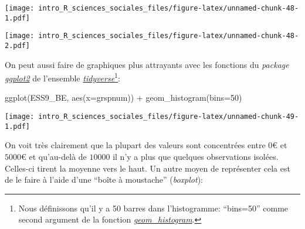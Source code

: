 \documentclass[
]{book}
\newenvironment{Shaded}{\begin{snugshade}}{\end{snugshade}}
\newcommand{\AttributeTok}[1]{\textcolor[rgb]{0.77,0.63,0.00}{#1}}
\newcommand{\DecValTok}[1]{\textcolor[rgb]{0.00,0.00,0.81}{#1}}
\newcommand{\FunctionTok}[1]{\textcolor[rgb]{0.00,0.00,0.00}{#1}}
\newcommand{\NormalTok}[1]{#1}
\newcommand{\SpecialCharTok}[1]{\textcolor[rgb]{0.00,0.00,0.00}{#1}}
\begin{document}
\begin{Shaded}
\end{Shaded}

\texttt{[image: intro\_R\_sciences\_sociales\_files/figure-latex/unnamed-chunk-48-1.pdf]}

\begin{Shaded}
\end{Shaded}

\texttt{[image: intro\_R\_sciences\_sociales\_files/figure-latex/unnamed-chunk-48-2.pdf]}

On peut aussi faire de graphiques plus attrayants avec les fonctions du \emph{package} \href{https://ggplot2.tidyverse.org/}{\emph{ggplot2}} de l'ensemble \href{https://www.tidyverse.org/}{\emph{tidyverse}}\footnote{Nous définissons qu'il y a 50 barres dans l'histogramme: ``bins=50'' comme second argument de la fonction \href{https://ggplot2.tidyverse.org/reference/geom_histogram.html}{\emph{geom\_histogram}}.}:

\begin{Shaded}
\begin{Highlighting}[]
\FunctionTok{ggplot}\NormalTok{(ESS9\_BE, }\FunctionTok{aes}\NormalTok{(}\AttributeTok{x=}\NormalTok{grspnum)) }\SpecialCharTok{+}
  \FunctionTok{geom\_histogram}\NormalTok{(}\AttributeTok{bins=}\DecValTok{50}\NormalTok{)}
\end{Highlighting}
\end{Shaded}

\texttt{[image: intro\_R\_sciences\_sociales\_files/figure-latex/unnamed-chunk-49-1.pdf]}

On voit très clairement que la plupart des valeurs sont concentrées entre \(0€\) et \(5000€\) et qu'au-delà de \(10000\) il n'y a plus que quelques observations isolées. Celles-ci tirent la moyenne vers le haut. Un autre moyen de représenter cela est de le faire à l'aide d'une ``boîte à moustache'' (\emph{boxplot}):

\begin{Shaded}
\end{Shaded}
\end{document}
